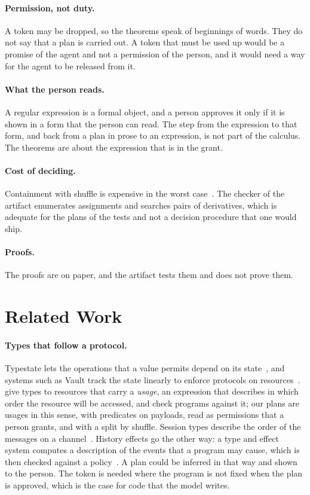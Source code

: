 \documentclass[acmsmall,nonacm,screen]{acmart}
\begin{document}
\paragraph{Permission, not duty.} A token may be dropped, so the theorems speak of
beginnings of words. They do not say that a plan is carried out. A token that must be used up
would be a promise of the agent and not a permission of the person, and it would need a way
for the agent to be released from it.

\paragraph{What the person reads.} A regular expression is a formal object, and a person
approves it only if it is shown in a form that the person can read. The step from the
expression to that form, and back from a plan in prose to an expression, is not part of the
calculus. The theorems are about the expression that is in the grant.

\paragraph{Cost of deciding.} Containment with shuffle is expensive in the worst
case~\citep{mayer1994}. The checker of the artifact enumerates assignments and searches
pairs of derivatives, which is adequate for the plans of the tests and not a decision
procedure that one would ship.

\paragraph{Proofs.} The proofs are on paper, and the artifact tests them and does not prove
them.

\section{Related Work}
\label{sec:related}

\paragraph{Types that follow a protocol.} Typestate lets the operations that a value permits
depend on its state~\citep{strom1986}, and systems such as Vault track the state linearly to
enforce protocols on resources~\citep{deline2001}. \citet{igarashi2002} give types to
resources that carry a \emph{usage}, an expression that describes in which order the
resource will be accessed, and check programs against it; our plans are usages in this
sense, with predicates on payloads, read as permissions that a person grants, and with a
split by shuffle. Session types describe the order of the messages on a
channel~\citep{honda1993}. History effects go the other way: a type and effect system
computes a description of the events that a program may cause, which is then checked against
a policy~\citep{skalka2004}. A plan could be inferred in that way and shown to the person.
The token is needed where the program is not fixed when the plan is approved, which is the
case for code that the model writes.
\end{document}
